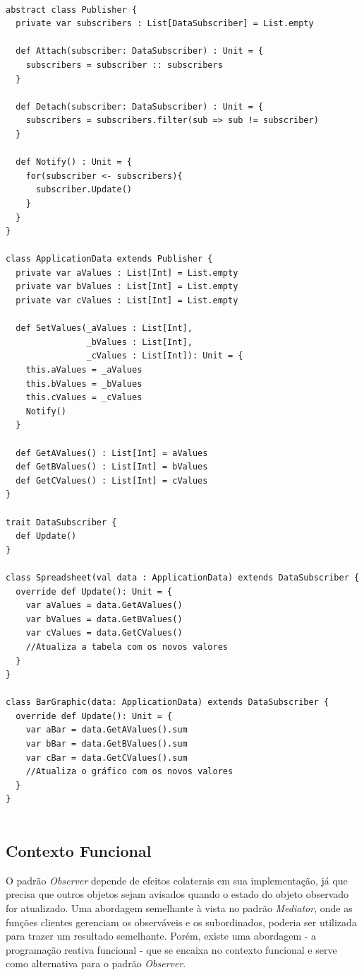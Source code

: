 \begin{lstlisting}[caption={\textit{Observer} Orientação a Objetos.},label=ooobserver]

abstract class Publisher {
  private var subscribers : List[DataSubscriber] = List.empty

  def Attach(subscriber: DataSubscriber) : Unit = {
    subscribers = subscriber :: subscribers
  }

  def Detach(subscriber: DataSubscriber) : Unit = {
    subscribers = subscribers.filter(sub => sub != subscriber)
  }

  def Notify() : Unit = {
    for(subscriber <- subscribers){
      subscriber.Update()
    }
  }
}

class ApplicationData extends Publisher {
  private var aValues : List[Int] = List.empty
  private var bValues : List[Int] = List.empty
  private var cValues : List[Int] = List.empty

  def SetValues(_aValues : List[Int],
                _bValues : List[Int],
                _cValues : List[Int]): Unit = {
    this.aValues = _aValues
    this.bValues = _bValues
    this.cValues = _cValues
    Notify()
  }

  def GetAValues() : List[Int] = aValues
  def GetBValues() : List[Int] = bValues
  def GetCValues() : List[Int] = cValues
}

trait DataSubscriber {
  def Update()
}

class Spreadsheet(val data : ApplicationData) extends DataSubscriber {
  override def Update(): Unit = {
    var aValues = data.GetAValues()
    var bValues = data.GetBValues()
    var cValues = data.GetCValues()
    //Atualiza a tabela com os novos valores
  }
}

class BarGraphic(data: ApplicationData) extends DataSubscriber {
  override def Update(): Unit = {
    var aBar = data.GetAValues().sum
    var bBar = data.GetBValues().sum
    var cBar = data.GetCValues().sum
    //Atualiza o gráfico com os novos valores
  }
}
    
\end{lstlisting}

\subsection*{Contexto Funcional}

O padrão \textit{Observer} depende de 
efeitos colaterais em sua implementação, 
já que precisa que outros objetos sejam avisados 
quando o estado do objeto observado for 
atualizado. Uma abordagem semelhante à vista 
no padrão \textit{Mediator}, onde as funções clientes 
gerenciam os observáveis e os subordinados, 
poderia ser utilizada para trazer um resultado 
semelhante. Porém, existe uma abordagem - a 
programação reativa funcional - que se encaixa 
no contexto funcional e serve como alternativa 
para o padrão \textit{Observer}\cite{reactiveprog}.


